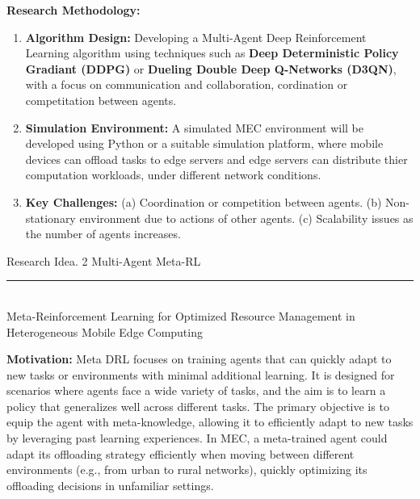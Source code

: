 \documentclass[12pt]{article}
\begin{document}
\noindent\textbf{\large Research Methodology: }
\begin{enumerate} 
	\item \textbf{Algorithm Design:} Developing a Multi-Agent Deep Reinforcement Learning algorithm using techniques such as \textbf{Deep Deterministic Policy Gradiant (DDPG)} or \textbf{Dueling Double Deep Q-Networks (D3QN)}, with a focus on communication and collaboration, cordination or competitation between agents. \vspace{-1mm}
	\item \textbf{Simulation Environment:} A simulated MEC environment will be developed using Python or a suitable simulation platform, where mobile devices can offload tasks to edge servers and edge servers can distribute thier computation workloads, under different network conditions.\vspace{-1mm}
	\item \textbf{Key Challenges:} (a) Coordination or competition between agents. (b) Non-stationary environment due to actions of other agents.  (c) Scalability issues as the number of agents increases.
\end{enumerate}



\newpage




\begin{center} 
	
	
	\vspace{-17mm}
	
	\large Research Idea. 2  \hfill Multi-Agent Meta-RL \vspace{1mm} \hrule
	
	\vspace{-1mm}
	
	
	
	\textcolor{white}{i} \\ \LARGE Meta-Reinforcement Learning for Optimized Resource Management in Heterogeneous Mobile Edge Computing  \vspace{6mm}\\
	
\end{center}
\vspace{-5mm}

\noindent\textbf{\large Motivation:  }
\noindent
Meta DRL focuses on training agents that can quickly adapt to new tasks or environments with minimal additional learning. It is designed for scenarios where agents face a wide variety of tasks, and the aim is to learn a policy that generalizes well across different tasks. The primary objective is to equip the agent with meta-knowledge, allowing it to efficiently adapt to new tasks by leveraging past learning experiences. In MEC, a meta-trained agent could adapt its offloading strategy efficiently when moving between different environments (e.g., from urban to rural networks), quickly optimizing its offloading decisions in unfamiliar settings.
\end{document}
